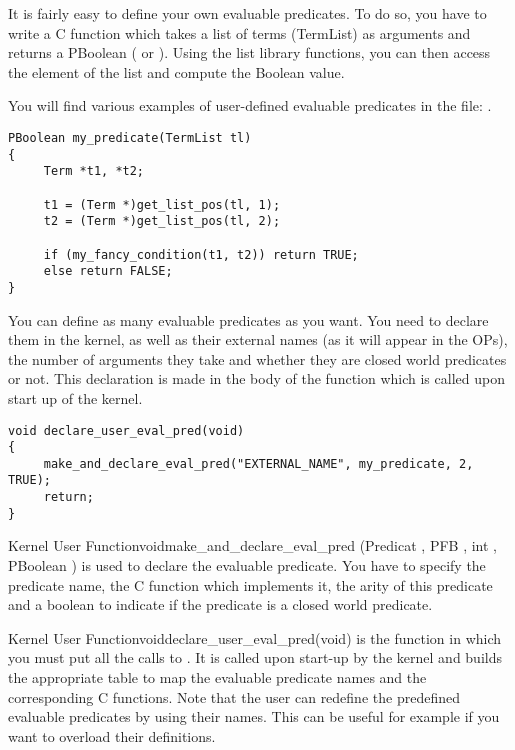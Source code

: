 It is fairly easy to define your own evaluable predicates. To do so, you
have to write a C function which takes a list of terms (TermList) as
arguments and returns a PBoolean ( or ). Using the list library
functions, you can then access the element of the list and compute the
Boolean value.

You will find various examples of user-defined evaluable predicates in the
file: .

\begin{verbatim}
PBoolean my_predicate(TermList tl)
{
     Term *t1, *t2;

     t1 = (Term *)get_list_pos(tl, 1);
     t2 = (Term *)get_list_pos(tl, 2);

     if (my_fancy_condition(t1, t2)) return TRUE;
     else return FALSE;
}
\end{verbatim}

You can define as many evaluable predicates as you want. You need to
declare them in the kernel, as well as their external names (as it will
appear in the OPs), the number of arguments they take and whether they are
closed world predicates or not. This declaration is made in the body of
the  function which is called upon start up
of the kernel.

\begin{verbatim}
void declare_user_eval_pred(void)
{
     make_and_declare_eval_pred("EXTERNAL_NAME", my_predicate, 2, TRUE);
     return;
}
\end{verbatim}

\begin{typefn}{Kernel User Function}{void}{make\_and\_declare\_eval\_pred}
        {(Predicat , PFB , int , PBoolean )}
is used to declare the evaluable predicate. You have to specify the
predicate name, the C function which implements it, the arity of this
predicate and a boolean to indicate if the predicate is a closed world
predicate.
\end{typefn}

\begin{typefn}{Kernel User Function}{void}{declare\_user\_eval\_pred}{(void)} 
is the function in which you must put all the calls to
. It is called upon start-up by the kernel and
builds the appropriate table to map the evaluable predicate names and the
corresponding C functions. Note that the user can redefine the predefined
evaluable predicates by using their names. This can be useful for example if
you want to overload their definitions.
\end{typefn}


